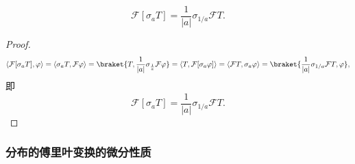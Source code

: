 \begin{theorem}[分布的傅里叶变换的尺度变换]
    \begin{equation}
        \mathcal{F}[\sigma_a T]=\frac{1}{|a|}\sigma_{1/a}\mathcal{F}T.
    \end{equation}
\end{theorem}
\begin{proof}
    \begin{equation}
        \langle\mathcal{F}[\sigma_a T],\varphi\rangle =\langle \sigma_a T,\mathcal{F}\varphi\rangle=\braket{T,\frac{1}{|a|}\sigma_{\frac{1}{a}}\mathcal{F}\varphi}=\langle T,\mathcal{F}[\sigma_a \varphi]\rangle=\langle \mathcal{F}T,\sigma_a\varphi\rangle=\braket{\frac{1}{|a|}\sigma_{1/a}\mathcal{F}T,\varphi},
    \end{equation}
    即
    \begin{equation}
        \mathcal{F}[\sigma_a T]=\frac{1}{|a|}\sigma_{1/a}\mathcal{F}T.
    \end{equation}
\end{proof}

\subsubsection{分布的傅里叶变换的微分性质}

